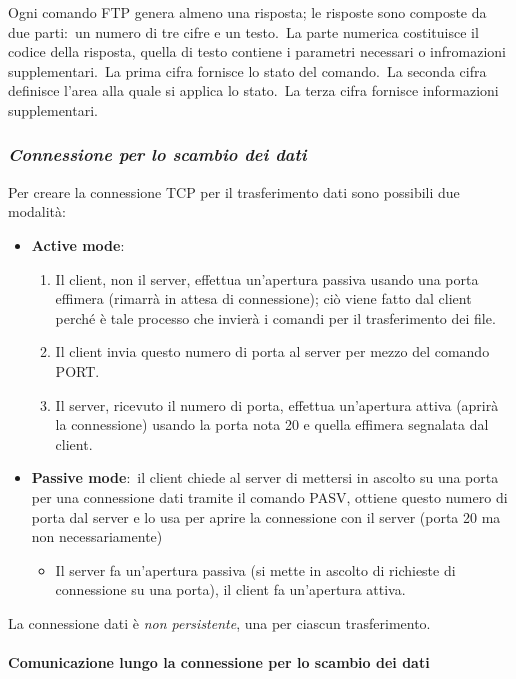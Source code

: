 Ogni comando FTP genera almeno una risposta; le risposte sono composte da due parti:\ un numero di tre cifre e un testo.\
La parte numerica costituisce il codice della risposta, quella di testo contiene i parametri necessari o infromazioni supplementari.\
La prima cifra fornisce lo stato del comando.\
La seconda cifra definisce l'area alla quale si applica lo stato.\
La terza cifra fornisce informazioni supplementari.

\pagebreak
\subsubsection{\emph{Connessione per lo scambio dei dati}}

Per creare la connessione TCP per il trasferimento dati sono possibili due modalità:

\begin{itemize}
    \item \textbf{Active mode}:
          \begin{enumerate}
              \item Il client, non il server, effettua un'apertura passiva usando una porta effimera (rimarrà in attesa di connessione); ciò viene fatto dal client perché è tale processo che invierà i 				comandi per il trasferimento dei file.
              \item Il client invia questo numero di porta al server per mezzo del comando PORT.
              \item Il server, ricevuto il numero di porta, effettua un'apertura attiva (aprirà la connessione) usando la porta nota 20 e quella effimera segnalata dal client.
          \end{enumerate}
    \item \textbf{Passive mode}:\ il client chiede al server di mettersi in ascolto su una porta per una connessione dati tramite il comando PASV, ottiene questo numero di porta dal server e lo usa per aprire la connessione con il server (porta 20 ma non necessariamente)
          \begin{itemize}
              \item Il server fa un'apertura passiva (si mette in ascolto di richieste di connessione su una porta), il client fa un'apertura attiva.
          \end{itemize}
\end{itemize}
La connessione dati è \emph{non persistente}, una per ciascun trasferimento.

\paragraph{Comunicazione lungo la connessione per lo scambio dei dati}

